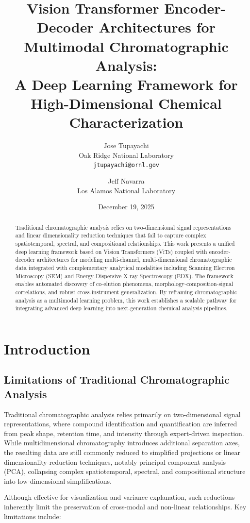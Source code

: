 \documentclass[12pt,a4paper]{article}
\title{\textbf{Vision Transformer Encoder-Decoder Architectures for Multimodal Chromatographic Analysis: \\ A Deep Learning Framework for High-Dimensional Chemical Characterization}}
\author{
    Jose Tupayachi \\
    Oak Ridge National Laboratory \\
    \texttt{jtupayachi@ornl.gov}
    \and
    Jeff Navarra \\
    Los Alamos National Laboratory
}
\date{December 19, 2025}
\begin{document}
\maketitle

\begin{abstract}
Traditional chromatographic analysis relies on two-dimensional signal representations and linear dimensionality reduction techniques that fail to capture complex spatiotemporal, spectral, and compositional relationships. This work presents a unified deep learning framework based on Vision Transformers (ViTs) coupled with encoder-decoder architectures for modeling multi-channel, multi-dimensional chromatographic data integrated with complementary analytical modalities including Scanning Electron Microscopy (SEM) and Energy-Dispersive X-ray Spectroscopy (EDX). The framework enables automated discovery of co-elution phenomena, morphology-composition-signal correlations, and robust cross-instrument generalization. By reframing chromatographic analysis as a multimodal learning problem, this work establishes a scalable pathway for integrating advanced deep learning into next-generation chemical analysis pipelines.
\end{abstract}

\section{Introduction}

\subsection{Limitations of Traditional Chromatographic Analysis}

Traditional chromatographic analysis relies primarily on two-dimensional signal representations, where compound identification and quantification are inferred from peak shape, retention time, and intensity through expert-driven inspection. While multidimensional chromatography introduces additional separation axes, the resulting data are still commonly reduced to simplified projections or linear dimensionality-reduction techniques, notably principal component analysis (PCA), collapsing complex spatiotemporal, spectral, and compositional structure into low-dimensional simplifications.

Although effective for visualization and variance explanation, such reductions inherently limit the preservation of cross-modal and non-linear relationships. Key limitations include:
\end{document}
